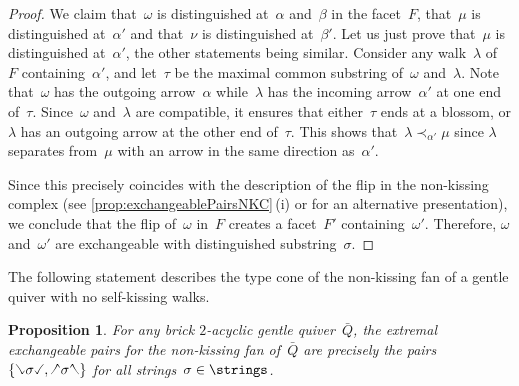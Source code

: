 \documentclass{amsart}
\newtheorem{proposition}[theorem]{Proposition}
\theoremstyle{definition}
\newcommand{\quiver}{\bar Q} %
\newcommand{\hL}{\text{\rotatebox[origin=c]{180}{\checked}}}
\newcommand{\hR}{\text{\rotatebox[origin=c]{180}{\reflectbox{\checked}}}}
\newcommand{\cL}{\text{\reflectbox{\checked}}}
\newcommand{\cR}{\text{\checked}}
\newcommand{\hh}[1]{\hL#1\hR} %
\newcommand{\cc}[1]{\cL#1\cR} %
\begin{document}
\begin{proof}
We claim that~$\omega$ is distinguished at~$\alpha$ and~$\beta$ in the facet~$F$, that~$\mu$ is distinguished at~$\alpha'$ and that~$\nu$ is distinguished at~$\beta'$.
Let us just prove that~$\mu$ is distinguished at~$\alpha'$, the other statements being similar.
Consider any walk~$\lambda$ of~$F$ containing~$\alpha'$, and let~$\tau$ be the maximal common substring of~$\omega$ and~$\lambda$.
Note that~$\omega$ has the outgoing arrow~$\alpha$ while~$\lambda$ has the incoming arrow~$\alpha'$ at one end of~$\tau$.
Since~$\omega$ and~$\lambda$ are compatible, it ensures that either~$\tau$ ends at a blossom, or $\lambda$ has an outgoing arrow at the other end of~$\tau$.
This shows that~$\lambda \prec_{\alpha'} \mu$ since $\lambda$ separates from~$\mu$ with an arrow in the same direction as~$\alpha'$.

Since this precisely coincides with the description of the flip in the non-kissing complex (see \cref{prop:exchangeablePairsNKC}\,(i) or \cite[Prop.~2.31]{PaluPilaudPlamondon-nonkissing} for an alternative presentation), we conclude that the flip of~$\omega$ in~$F$ creates a facet~$F'$ containing~$\omega'$.
Therefore, $\omega$ and~$\omega'$ are exchangeable with distinguished substring~$\sigma$.
\end{proof}

The following statement describes the type cone of the non-kissing fan of a gentle quiver with no self-kissing walks.

\begin{proposition}
\label{prop:extremalExchangeablePairsNKC}
For any brick $2$-acyclic gentle quiver~$\quiver$, the extremal exchangeable pairs for the non-kissing fan of~$\quiver$ are precisely the pairs~$\{\cc{\sigma}, \hh{\sigma}\}$ for all strings~$\sigma \in \strings$.
\end{proposition}
\end{document}
